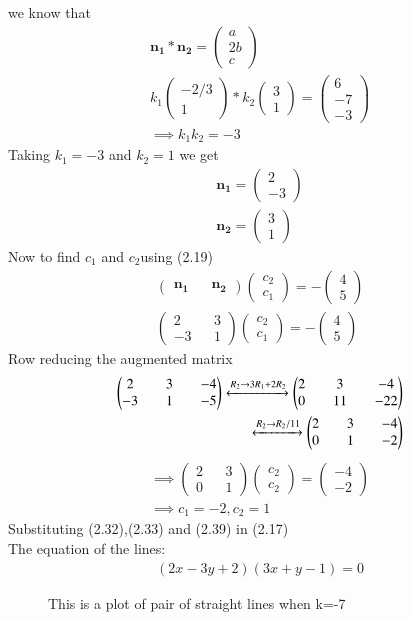 \documentclass[journal,13pt,twocolumn]{IEEEtran}
\newcommand{\myvec}[1]{\ensuremath{\begin{pmatrix}#1\end{pmatrix}}}
\renewcommand{\vec}[1]{\mathbf{#1}}
\begin{document}
we know that
\begin{align}
\vec{n_1} * \vec{n_2} =\myvec{a\\2b\\c}\\
k_1 \myvec{-2/3 \\ 1} *  k_2 \myvec{3 \\ 1} = \myvec{6\\-7\\-3}\\
\implies k_1k_2 = -3
\end{align}
Taking $k_1 = -3$ and $k_2 = 1$ we get
\begin{align}
\vec{n_1} = \myvec{2 \\ -3}\\
\vec{n_2} = \myvec{3 \\ 1}
\end{align}
Now to find $ c_1 $ and $ c_2 $using (2.19) 
\begin{align}
\myvec{\vec{n_1} && \vec{n_2}} \myvec{c_2 \\ c_1} = -\myvec{4 \\ 5}\\
\myvec{2 && 3\\ -3 && 1}\myvec{c_2 \\ c_1} = -\myvec{4 \\ 5}
\end{align}
Row reducing the augmented matrix
\begin{align}
\myvec{2 && 3 && -4\\ -3 && 1 && -5} \xleftrightarrow[]{R_2\rightarrow 3R_1+2R_2}\myvec{2 && 3 && -4\\ 0 && 11 && -22}\\
\xleftrightarrow[]{R_2\rightarrow R_2/11}\myvec{2 && 3 && -4\\ 0 && 1 && -2}
\end{align}
\begin{align}
\implies \myvec{2 && 3\\ 0 && 1}\myvec{c_2 \\ c_2} = \myvec{-4 \\ -2}\\
\implies c_1 = -2 , c_2 = 1
\end{align}
Substituting (2.32),(2.33) and (2.39) in (2.17)\\
The equation of the lines:
\begin{align}
\boxed{(2x - 3y + 2)(3x + y - 1) = 0}
\end{align}
\begin{figure}
   \centering
   \caption{This is a plot of pair of straight lines when k=-7}
   \end{figure}
\end{document}
